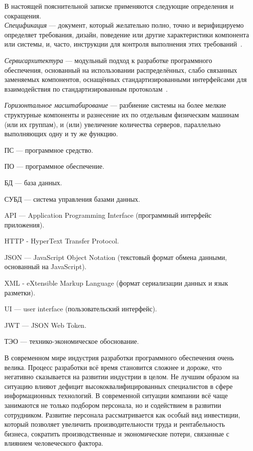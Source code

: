 \label{sec:definitions}
\label{sec:introduction}
\setcounter{page}{6}

В настоящей пояснительной записке применяются следующие определения и сокращения.
\\

\emph{Спецификация} — документ, который желательно полно, точно и верифицируемо определяет требования, дизайн, поведение или другие характеристики компонента или системы, и, часто, инструкции для контроля выполнения этих требований~\cite{istqb_specification}.

\emph{Сервис архитектура} — модульный подход к разработке программного обеспечения, основанный на использовании распределённых, слабо связанных заменяемых компонентов, оснащённых стандартизированными интерфейсами для взаимодействия по стандартизированным протоколам~\cite{wiki_soa}.

\emph{Горизонтальное масштабирование} — разбиение системы на более мелкие структурные компоненты и разнесение их по отдельным физическим машинам (или их группам), и (или) увеличение количества серверов, параллельно выполняющих одну и ту же функцию.

ПС — программное средство.

ПО — программное обеспечение.

БД — база данных.

СУБД — система управления базами данных.

API — Application Programming Interface (программный интерфейс приложения).

HTTP - HyperText Transfer Protocol.

JSON — JavaScript Object Notation (текстовый формат обмена данными, основанный на JavaScript).

XML - eXtensible Markup Language (формат сериализации данных и язык разметки).

UI — user interface (пользовательский интерфейс).

JWT — JSON Web Token.

ТЭО — технико-экономическое обоснование.

\newpage

\label{sec:introduction}

В современном мире индустрия разработки программного обеспечения очень велика. Процесс разработки всё время становится сложнее и дороже, что негативно сказывается на развитии индустрии в целом. Не лучшим образом на ситуацию влияют дефицит высококвалифицированных специалистов в сфере информационных технологий. В современной ситуации компании всё чаще занимаются не только подбором персонала, но и содействием в развитии сотрудником. Развитие персонала рассматривается как особый вид инвестиции, который позволяет увеличить производительности труда и рентабельность бизнеса, сократить производственные и экономические потери, связанные с влиянием человеческого фактора.

